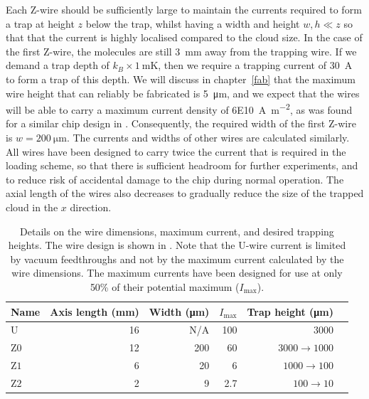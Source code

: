 Each Z-wire should be sufficiently large to maintain the currents required to
form a trap at height $z$ below the trap, whilst having a width and height  $w,
h \ll z$ so that that the current is highly localised compared to the cloud
size.
%
In the case of the first Z-wire, the molecules are still \SI{3}{\milli\meter}
away from the trapping wire. If we demand a trap depth of
$k_B\times\SI{1}{\milli\kelvin}$, then we require a trapping current of
\SI{30}{\ampere} to form a trap of this depth.  We will discuss in
chapter~\ref{fab} that the maximum wire height that can reliably be fabricated
is \SI{5}{\micro\meter}, and we expect that the wires will be able to carry a
maximum current density of \SI{6E10}{\ampere\per\meter\squared}, as was found
for a similar chip design in . Consequently, the
required width of the first Z-wire is $w=\SI{200}{\micro\meter}$. The currents
and widths of other wires are calculated similarly.
%
All wires have been designed to
carry twice the current that is required in the loading scheme, so that there
is sufficient headroom for further experiments, and to reduce risk of
accidental damage to the chip during normal operation.
%
The axial length of the wires also decreases to gradually reduce the size of
the trapped cloud in the $x$ direction.  

\begin{table}
  \centering
\begin{tabular}{lrrrrr}
  \hline\hline
  Name & Axis length (\si{\milli\meter}) & Width (\si{\micro\meter})& $I_\text{max}$ & Trap height (\si{\micro\meter}) \\
 \hline
  U & 16 & N/A& 100 & 3000\\
  $\mathrm{Z0}$ & 12 & 200& 60& $3000\rightarrow1000$ \\
  $\mathrm{Z1}$ &  6 & 20& 6& $1000\rightarrow100$ \\
  $\mathrm{Z2}$ &  2 & 9& 2.7& $100\rightarrow10$ \\
 \hline
\end{tabular}
  \caption[Trapping wire properties]{
    Details on the wire dimensions, maximum current, and desired
  trapping heights. The wire design is shown in
  . Note that the U-wire current is
  limited by vacuum feedthroughs and not by the maximum current calculated by
  the wire dimensions.  The maximum currents have been designed for use at only
  50\% of their potential maximum ($I_\text{max}$).
  }
  \label{overview:table:wires}
\end{table}

